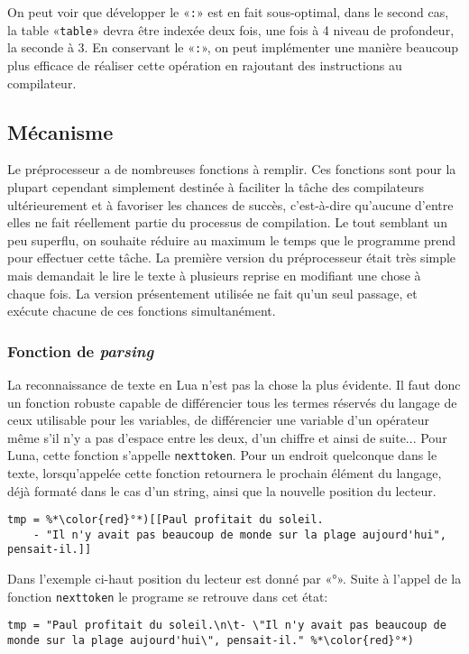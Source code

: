 \documentclass{article}
\begin{document}
On peut voir que développer le «\texttt{:}» est en fait sous-optimal, dans le second cas, la table «\texttt{table}» devra être indexée deux fois, une fois à 4 niveau de profondeur, la seconde à 3. En conservant le «\texttt{:}», on peut implémenter une manière beaucoup plus efficace de réaliser cette opération en rajoutant des instructions au compilateur.

\subsection{Mécanisme}
Le préprocesseur a de nombreuses fonctions à remplir. Ces fonctions sont pour la plupart cependant simplement destinée à faciliter la tâche des compilateurs ultérieurement et à favoriser les chances de succès, c'est-à-dire qu'aucune d'entre elles ne fait réellement partie du processus de compilation. Le tout semblant un peu superflu, on souhaite réduire au maximum le temps que le programme prend pour effectuer cette tâche. La première version du préprocesseur était très simple mais demandait le lire le texte à plusieurs reprise en modifiant une chose à chaque fois. La version présentement utilisée ne fait qu'un seul passage, et exécute chacune de ces fonctions simultanément.

\subsubsection{Fonction de \textit{parsing}}
La reconnaissance de texte en Lua n'est pas la chose la plus évidente. Il faut donc un fonction robuste capable de différencier tous les termes réservés du langage de ceux utilisable pour les variables, de différencier une variable d'un opérateur même s'il n'y a pas d'espace entre les deux, d'un chiffre et ainsi de suite... Pour Luna, cette fonction s'appelle \texttt{nexttoken}. Pour un endroit quelconque dans le texte, lorsqu'appelée cette fonction retournera le prochain élément du langage, déjà formaté dans le cas d'un string, ainsi que la nouvelle position du lecteur.
\begin{lstlisting}[caption={Lecture d'un string},label=DescriptiveLabel]
tmp = %*\color{red}°*)[[Paul profitait du soleil.
	- "Il n'y avait pas beaucoup de monde sur la plage aujourd'hui", pensait-il.]]
\end{lstlisting}

Dans l'exemple ci-haut position du lecteur est donné par «{\color{red}°}». Suite à l'appel de la fonction \texttt{nexttoken} le programe se retrouve dans cet état:
\begin{lstlisting}[belowcaptionskip = -1\baselineskip]
tmp = "Paul profitait du soleil.\n\t- \"Il n'y avait pas beaucoup de monde sur la plage aujourd'hui\", pensait-il." %*\color{red}°*)
\end{lstlisting}
\end{document}
